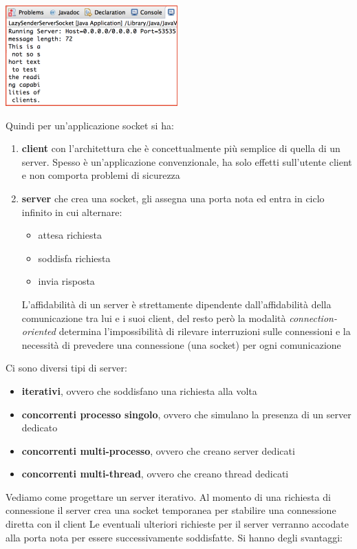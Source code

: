 \documentclass[a4paper,12pt, oneside]{book}
\begin{document}
\begin{center}
	\includegraphics[scale=0.7]{img/lazy.png}
\end{center}
Quindi per un'applicazione socket si ha:
\begin{enumerate}
	\item \textbf{client} con l'architettura che è concettualmente più semplice di quella di un server. Spesso è un'applicazione convenzionale, ha solo effetti sull'utente client e non comporta problemi di sicurezza
	\item \textbf{server} che crea una socket, gli assegna una porta nota ed entra in ciclo infinito in cui alternare:
	      \begin{itemize}
		      \item attesa richiesta
		      \item soddisfa richiesta
		      \item invia risposta
	      \end{itemize}
	      L'affidabilità di un server è strettamente dipendente
	      dall'affidabilità della comunicazione tra lui e i suoi client, del resto però la modalità \textit{connection-oriented} determina l'impossibilità di rilevare interruzioni sulle connessioni e la necessità di prevedere una connessione (una socket) per ogni comunicazione
\end{enumerate}
Ci sono diversi tipi di server:
\begin{itemize}
	\item \textbf{iterativi}, ovvero che soddisfano una richiesta alla volta
	\item \textbf{concorrenti processo singolo}, ovvero che
	      simulano la presenza di un server dedicato
	\item \textbf{concorrenti multi-processo}, ovvero che
	      creano server dedicati
	\item \textbf{concorrenti multi-thread}, ovvero che
	      creano thread dedicati
\end{itemize}
Vediamo come progettare un server iterativo. Al momento di una richiesta di connessione il server crea una
socket temporanea per stabilire una connessione diretta con il client Le eventuali ulteriori richieste per il server verranno accodate alla porta nota per essere successivamente soddisfatte. Si hanno degli svantaggi:
\end{document}
